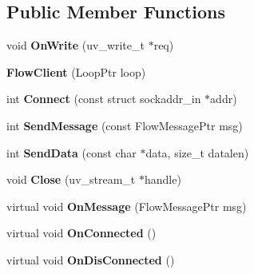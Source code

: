 \subsection*{Public Member Functions}
\begin{DoxyCompactItemize}
\item 
void {\bfseries On\+Write} (uv\+\_\+write\+\_\+t $\ast$req)\hypertarget{classflow_1_1_flow_client_a5ba3b4c9a957cdca466b7a6e01dba5b7}{}\label{classflow_1_1_flow_client_a5ba3b4c9a957cdca466b7a6e01dba5b7}

\item 
{\bfseries Flow\+Client} (Loop\+Ptr loop)\hypertarget{classflow_1_1_flow_client_ac3a36db5ffd694de6707b74d248fa479}{}\label{classflow_1_1_flow_client_ac3a36db5ffd694de6707b74d248fa479}

\item 
int {\bfseries Connect} (const struct sockaddr\+\_\+in $\ast$addr)\hypertarget{classflow_1_1_flow_client_a12e2ac3a308ec56a045247a6e69bf2ba}{}\label{classflow_1_1_flow_client_a12e2ac3a308ec56a045247a6e69bf2ba}

\item 
int {\bfseries Send\+Message} (const Flow\+Message\+Ptr msg)\hypertarget{classflow_1_1_flow_client_a0fe4cb2ac9e0f0f3f29f15b40db4f083}{}\label{classflow_1_1_flow_client_a0fe4cb2ac9e0f0f3f29f15b40db4f083}

\item 
int {\bfseries Send\+Data} (const char $\ast$data, size\+\_\+t datalen)\hypertarget{classflow_1_1_flow_client_a62c5687e6f9f6c50a4e2a500c8305119}{}\label{classflow_1_1_flow_client_a62c5687e6f9f6c50a4e2a500c8305119}

\item 
void {\bfseries Close} (uv\+\_\+stream\+\_\+t $\ast$handle)\hypertarget{classflow_1_1_flow_client_aac41116993040256279a2c62306ec420}{}\label{classflow_1_1_flow_client_aac41116993040256279a2c62306ec420}

\item 
virtual void {\bfseries On\+Message} (Flow\+Message\+Ptr msg)\hypertarget{classflow_1_1_flow_client_af43b4ad866dad8058ba85427d5d6641b}{}\label{classflow_1_1_flow_client_af43b4ad866dad8058ba85427d5d6641b}

\item 
virtual void {\bfseries On\+Connected} ()\hypertarget{classflow_1_1_flow_client_a612475e9e473454296446e7c21149d56}{}\label{classflow_1_1_flow_client_a612475e9e473454296446e7c21149d56}

\item 
virtual void {\bfseries On\+Dis\+Connected} ()\hypertarget{classflow_1_1_flow_client_ad039c16d084b55c49d733554a192132a}{}\label{classflow_1_1_flow_client_ad039c16d084b55c49d733554a192132a}

\end{DoxyCompactItemize}
